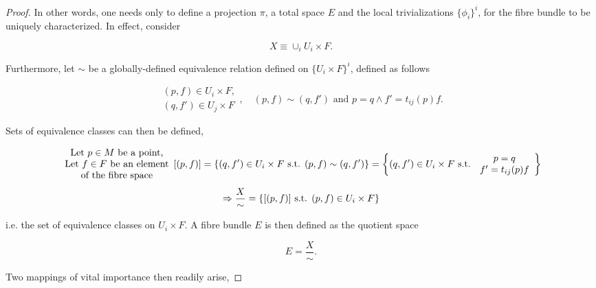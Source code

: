 \begin{proof}

    In other words, one needs only to define a projection $\pi$, a total space $E$ and the local trivializations $\{\phi_i\}^i$, for the fibre bundle to be uniquely characterized.
    In effect, consider 

    $$
        X \equiv \cup_{i} U_i \times F.
    $$

    Furthermore, let $\sim$ be a globally-defined equivalence relation defined on $\{U_i \times F\}^{i}$, defined as follows 

    \[
        \begin{array}{cc}
             (p, f) \in U_i \times F, \\
             (q, f') \in U_j \times F 
        \end{array}, \quad (p,f) \sim (q,f') \textrm{ and } p = q \land f' = t_{ij}(p) f. 
    \]

    Sets of equivalence classes can then be defined, 

    \[
        \begin{array}{cc}
             \textnormal{Let $p \in M$ be a point,} \\
             \textnormal{Let $f \in F$ be an element} \\
             \textnormal{of the fibre space}
        \end{array} [(p, f)] = \{
                                (q,f') \in U_i \times F \textnormal{ s.t. } (p,f) \sim (q, f')
                                    \} 
                             = \left\{
                                (q,f') \in U_i \times F \textnormal{ s.t. } \begin{array}{cc}
                                     p = q  \\
                                     f' = t_{ij}(p) f
                                \end{array}
                                \right\}
    \]
    \[
        \Rightarrow \frac{X}{\sim} = \{ [(p,f)] \textnormal{ s.t. } (p,f) \in U_i \times F\}
    \]
    
    i.e. the set of equivalence classes on $U_i \times F$.
    A fibre bundle $E$ is then defined as the quotient space 
    
    $$
        E = \frac{X}{\sim}.
    $$

    Two mappings of vital importance then readily arise, 


\end{proof}
